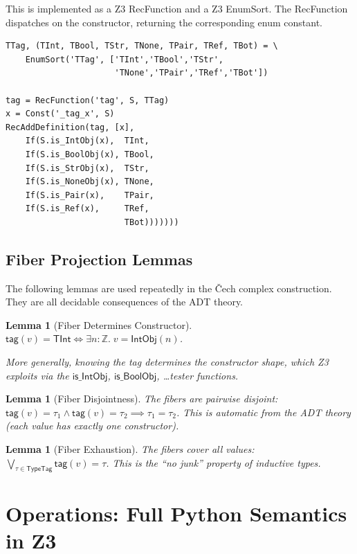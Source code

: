 \documentclass[11pt,a4paper]{report}
\theoremstyle{definition}
\theoremstyle{plain}
\newtheorem{lemma}[definition]{Lemma}
\newcommand{\Int}{\mathbb{Z}}
\begin{document}
This is implemented as a Z3 RecFunction and a Z3 EnumSort.  The
RecFunction dispatches on the constructor, returning the corresponding
enum constant.

\begin{lstlisting}[caption={TypeTag: complete Z3 implementation}]
TTag, (TInt, TBool, TStr, TNone, TPair, TRef, TBot) = \
    EnumSort('TTag', ['TInt','TBool','TStr',
                      'TNone','TPair','TRef','TBot'])

tag = RecFunction('tag', S, TTag)
x = Const('_tag_x', S)
RecAddDefinition(tag, [x],
    If(S.is_IntObj(x),  TInt,
    If(S.is_BoolObj(x), TBool,
    If(S.is_StrObj(x),  TStr,
    If(S.is_NoneObj(x), TNone,
    If(S.is_Pair(x),    TPair,
    If(S.is_Ref(x),     TRef,
                        TBot)))))))
\end{lstlisting}

\subsection{Fiber Projection Lemmas}

The following lemmas are used repeatedly in the \v{C}ech complex
construction.  They are all decidable consequences of the ADT theory.

\begin{lemma}[Fiber Determines Constructor]
\label{lem:fiber-constructor}
$\mathsf{tag}(v) = \mathsf{TInt} \iff \exists n : \Int.\;
v = \mathsf{IntObj}(n)$.

More generally, knowing the tag determines the constructor shape,
which Z3 exploits via the $\mathsf{is\_IntObj}$,
$\mathsf{is\_BoolObj}$, \ldots tester functions.
\end{lemma}

\begin{lemma}[Fiber Disjointness]
\label{lem:fiber-disjoint}
The fibers are pairwise disjoint: $\mathsf{tag}(v) = \tau_1 \land
\mathsf{tag}(v) = \tau_2 \implies \tau_1 = \tau_2$.
This is automatic from the ADT theory (each value has exactly one
constructor).
\end{lemma}

\begin{lemma}[Fiber Exhaustion]
The fibers cover all values: $\bigvee_{\tau \in \mathsf{TypeTag}}
\mathsf{tag}(v) = \tau$.  This is the ``no junk'' property of
inductive types.
\end{lemma}


\section{Operations: Full Python Semantics in Z3}
\end{document}
